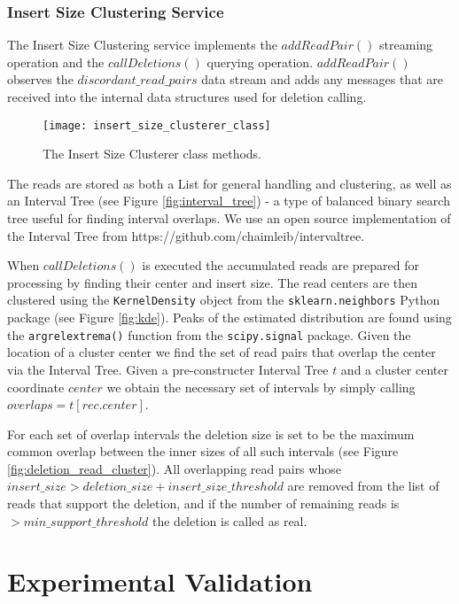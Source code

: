 \subsubsection{Insert Size Clustering Service}

The Insert Size Clustering service implements the $addReadPair()$ streaming operation and the $callDeletions()$ querying operation. $addReadPair()$ observes the $discordant\_read\_pairs$ data stream and adds any messages that are received into the internal data structures used for deletion calling. 

\begin{figure}[h!]
    \texttt{[image: insert\_size\_clusterer\_class]}
    \centering
    \caption {The Insert Size Clusterer class methods.}
    \label{fig:insert_size_clusterer_class}
\end{figure}

The reads are stored as both a List for general handling and clustering, as well as an Interval Tree (see Figure \ref{fig:interval_tree}) - a type of balanced binary search tree useful for finding interval overlaps. We use an open source implementation of the Interval Tree from https://github.com/chaimleib/intervaltree.

When $callDeletions()$ is executed the accumulated reads are prepared for processing by finding their center and insert size. The read centers are then clustered using the \texttt{KernelDensity} object from the \texttt{sklearn.neighbors} Python package (see Figure \ref{fig:kde}). Peaks of the estimated distribution are found using the \texttt{argrelextrema()} function from the \texttt{scipy.signal} package. Given the location of a cluster center we find the set of read pairs that overlap the center via the Interval Tree. Given a pre-constructer Interval Tree $t$ and a cluster center coordinate $center$ we obtain the necessary set of intervals by simply calling $overlaps = t[rec.center]$.

For each set of overlap intervals the deletion size is set to be the maximum common overlap between the inner sizes of all such intervals (see Figure \ref{fig:deletion_read_cluster}). All overlapping read pairs whose $insert\_size > deletion\_size + insert\_size\_threshold$ are removed from the list of reads that support the deletion, and if the number of remaining reads is $> min\_support\_threshold$ the deletion is called as real.

\section{Experimental Validation}

